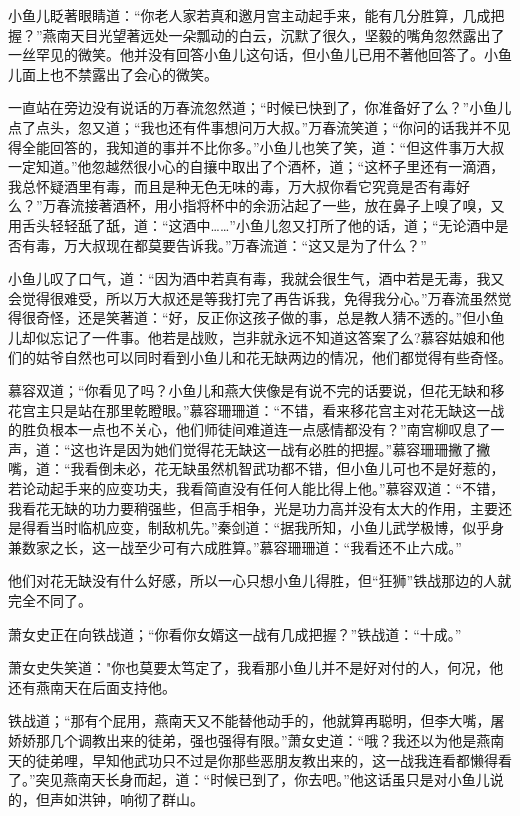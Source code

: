 \documentclass[12pt,oneside]{book}
\begin{document}
小鱼儿眨著眼睛道：``你老人家若真和邀月宫主动起手来，能有几分胜算，几成把握？''燕南天目光望著远处一朵瓢动的白云，沉默了很久，坚毅的嘴角忽然露出了一丝罕见的微笑。他并没有回答小鱼儿这句话，但小鱼儿已用不著他回答了。小鱼儿面上也不禁露出了会心的微笑。

一直站在旁边没有说话的万春流忽然道；``时候已快到了，你准备好了么？''小鱼儿点了点头，忽又道；``我也还有件事想问万大叔。''万春流笑道；``你问的话我并不见得全能回答的，我知道的事并不比你多。''小鱼儿也笑了笑，道：``但这件事万大叔一定知道。''他忽越然很小心的自攘中取出了个酒杯，道；``这杯子里还有一滴酒，我总怀疑酒里有毒，而且是种无色无味的毒，万大叔你看它究竟是否有毒好么？''万春流接著酒杯，用小指将杯中的余沥沾起了一些，放在鼻子上嗅了嗅，又用舌头轻轻舐了舐，道：``这酒中\ldots\ldots{}''小鱼儿忽又打所了他的话，道；``无论酒中是否有毒，万大叔现在都莫要告诉我。''万春流道：``这又是为了什么？''

小鱼儿叹了口气，道：``因为酒中若真有毒，我就会很生气，酒中若是无毒，我又会觉得很难受，所以万大叔还是等我打完了再告诉我，免得我分心。''万春流虽然觉得很奇怪，还是笑著道：``好，反正你这孩子做的事，总是教人猜不透的。''但小鱼儿却似忘记了一件事。他若是战败，岂非就永远不知道这答案了么?慕容姑娘和他们的姑爷自然也可以同时看到小鱼儿和花无缺两边的情况，他们都觉得有些奇怪。

慕容双道；``你看见了吗？小鱼儿和燕大侠像是有说不完的话要说，但花无缺和移花宫主只是站在那里乾瞪眼。''慕容珊珊道：``不错，看来移花宫主对花无缺这一战的胜负根本一点也不关心，他们师徒间难道连一点感情都没有？''南宫柳叹息了一声，道：``这也许是因为她们觉得花无缺这一战有必胜的把握。''慕容珊珊撇了撇嘴，道：``我看倒未必，花无缺虽然机智武功都不错，但小鱼儿可也不是好惹的，若论动起手来的应变功夫，我看简直没有任何人能比得上他。''慕容双道：``不错，我看花无缺的功力要稍强些，但高手相争，光是功力高并没有太大的作用，主要还是得看当时临机应变，制敌机先。''秦剑道：``据我所知，小鱼儿武学极博，似乎身兼数家之长，这一战至少可有六成胜算。''慕容珊珊道：``我看还不止六成。''

他们对花无缺没有什么好感，所以一心只想小鱼儿得胜，但``狂狮''铁战那边的人就完全不同了。

萧女史正在向铁战道；``你看你女婿这一战有几成把握？''铁战道：``十成。''

萧女史失笑道："你也莫要太笃定了，我看那小鱼儿并不是好对付的人，何况，他还有燕南天在后面支持他。

铁战道；``那有个屁用，燕南天又不能替他动手的，他就算再聪明，但李大嘴，屠娇娇那几个调教出来的徒弟，强也强得有限。''萧女史道：``哦？我还以为他是燕南天的徒弟哩，早知他武功只不过是你那些恶朋友教出来的，这一战我连看都懒得看了。''突见燕南天长身而起，道：``时候已到了，你去吧。''他这话虽只是对小鱼儿说的，但声如洪钟，响彻了群山。
\end{document}
